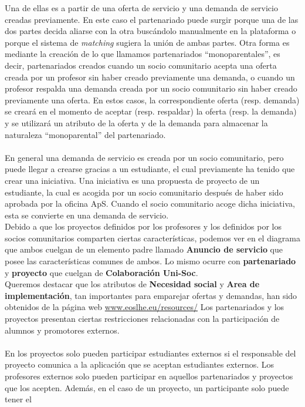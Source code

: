 \documentclass[11pt]{book}
\begin{document}
	Una de ellas es a partir de una oferta de servicio y una demanda de servicio creadas previamente. En este caso el partenariado puede surgir porque una de las dos partes decida aliarse con la otra buscándolo manualmente en la plataforma o porque el sistema de \textit{matching} sugiera la unión de ambas partes.
	Otra forma es mediante la creación de lo que llamamos partenariados ``monoparentales'', es decir, partenariados
	creados cuando un socio comunitario acepta una oferta creada por un
	profesor sin haber creado previamente una demanda, o cuando un profesor
	respalda una demanda creada por un socio comunitario sin haber creado
	previamente una oferta. En estos casos, la correspondiente oferta (resp.
	demanda) se creará en el momento de aceptar (resp. respaldar) la oferta
	(resp. la demanda) y se utilizará un atributo de la oferta y de la
	demanda para almacenar la naturaleza ``monoparental'' del partenariado.\\\\
	En general una demanda de servicio es creada por un socio comunitario, pero puede llegar a crearse gracias a un estudiante, el cual previamente ha tenido que crear una iniciativa. Una iniciativa es una propuesta de proyecto de un estudiante, la cual es acogida por un socio comunitario después de haber sido aprobada por la oficina ApS. Cuando el socio comunitario acoge dicha iniciativa, esta se convierte en una demanda de servicio.\\
	Debido a que los proyectos definidos por los profesores y los definidos por los socios comunitarios comparten ciertas características, podemos ver en el diagrama que ambos cuelgan de un elemento padre llamado \textbf{Anuncio de servicio} que posee las características comunes de ambos.
	Lo mismo ocurre con \textbf{partenariado} y \textbf{proyecto} que cuelgan de \textbf{Colaboración Uni-Soc}.\\
	Queremos destacar que los atributos de \textbf{Necesidad social} y \textbf{Area de implementación}, tan importantes para emparejar ofertas y demandas, han sido obtenidos de la página web \url{www.eoslhe.eu/resources/}
	Los partenariados y los proyectos presentan ciertas restricciones relacionadas con la participación de alumnos y promotores externos.\\\\
	En los proyectos solo pueden participar estudiantes externos si el responsable del proyecto comunica a la aplicación que se aceptan estudiantes externos. 
	Los profesores externos solo pueden participar en aquellos partenariados y proyectos que los acepten. Además, en el caso de un proyecto, un participante solo puede tener el
\end{document}
